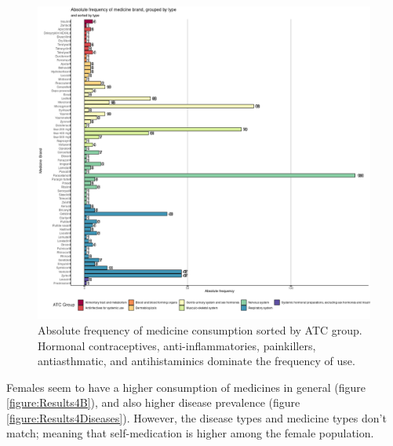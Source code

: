     \begin{figure}[H]
        \centering
            \includegraphics[width=0.9\linewidth]{figures/Results/ResultFour/CombinedLongRelBarPlot_typesAbsolute_Brand_TypeType.png } 
        \caption{Absolute frequency of medicine consumption sorted by ATC group. Hormonal contraceptives, anti-inflammatories, painkillers, antiasthmatic, and antihistaminics dominate the frequency of use.}
        \label{figure:Results4C}
    \end{figure}

Females seem to have a higher consumption of medicines in general (figure \ref{figure:Results4B}), and also higher disease prevalence (figure \ref{figure:Results4Diseases}). However, the disease types and medicine types don't match; meaning that self-medication is higher among the female population.


